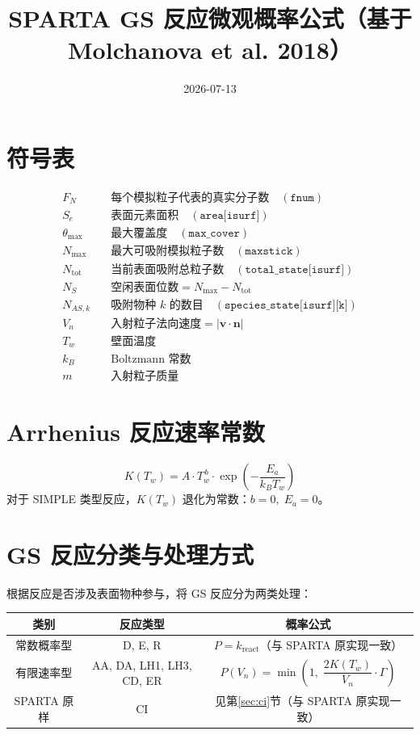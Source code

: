 \documentclass[12pt,a4paper]{article}
\title{SPARTA GS 反应微观概率公式（基于 Molchanova et al. 2018）}
\author{}
\date{2026-07-13}
\begin{document}
\maketitle

\section{符号表}
\begin{align*}
  F_N      & \quad \text{每个模拟粒子代表的真实分子数} \quad (\texttt{fnum})\\
  S_e      & \quad \text{表面元素面积} \quad (\texttt{area[isurf]})\\
  \theta_{\max} & \quad \text{最大覆盖度} \quad (\texttt{max\_cover})\\
  N_{\max} & \quad \text{最大可吸附模拟粒子数} \quad (\texttt{maxstick})\\
  N_{\text{tot}} & \quad \text{当前表面吸附总粒子数} \quad (\texttt{total\_state[isurf]})\\
  N_{S}    & \quad \text{空闲表面位数} = N_{\max} - N_{\text{tot}}\\
  N_{AS,k} & \quad \text{吸附物种 }k\text{ 的数目} \quad (\texttt{species\_state[isurf][k]})\\
  V_n      & \quad \text{入射粒子法向速度} = |\mathbf{v} \cdot \mathbf{n}|\\
  T_w      & \quad \text{壁面温度}\\
  k_B      & \quad \text{Boltzmann 常数}\\
  m        & \quad \text{入射粒子质量}
\end{align*}

\section{Arrhenius 反应速率常数}
\begin{equation}
  K(T_w) = A \cdot T_w^{\,b} \cdot \exp\!\left(-\frac{E_a}{k_B T_w}\right)
\end{equation}
对于 SIMPLE 类型反应，$K(T_w)$ 退化为常数：$b = 0,\; E_a = 0$。

\section{GS 反应分类与处理方式}

根据反应是否涉及表面物种参与，将 GS 反应分为两类处理：

\begin{center}
\begin{tabular}{c|c|c}
\toprule
\textbf{类别} & \textbf{反应类型} & \textbf{概率公式} \\
\midrule
常数概率型 & D, E, R & $P = k_{\text{react}}$（与 SPARTA 原实现一致）\\
有限速率型 & AA, DA, LH1, LH3, CD, ER & $P(V_n) = \min\!\left(1,\; \dfrac{2K(T_w)}{V_n} \cdot \Gamma\right)$ \\
\midrule
SPARTA 原样 & CI & 见第\ref{sec:ci}节（与 SPARTA 原实现一致）\\
\bottomrule
\end{tabular}
\end{center}
\end{document}
